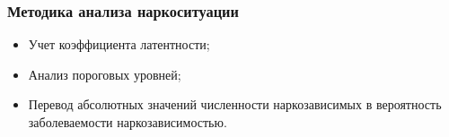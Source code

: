 \documentclass[t]{beamer}  %
\begin{document}
\begin{frame}
    \frametitle{Методика анализа наркоситуации} 
	\begin{itemize}
        \item Учет коэффициента латентности;
        \item Анализ пороговых уровней;
        \item Перевод абсолютных значений численности наркозависимых в
            вероятность заболеваемости наркозависимостью.
	\end{itemize}
\end{frame}
\end{document}
